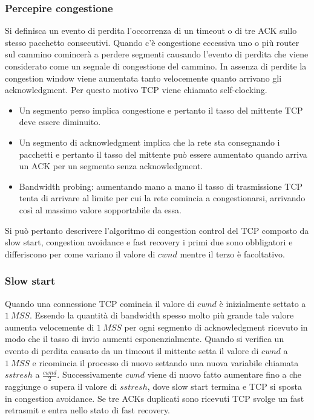 \subsubsection{Percepire congestione}
Si definisca un evento di perdita l'occorrenza di un timeout o di tre ACK sullo stesso pacchetto consecutivi. Quando c'\`e congestione eccessiva uno o pi\`u
router sul cammino comincer\`a a perdere segmenti causando l'evento di perdita che viene considerato come un segnale di congestione del cammino. In assenza
di perdite la congestion window viene aumentata tanto velocemente quanto arrivano gli acknowledgment. Per questo motivo TCP viene chiamato self-clocking. 
\begin{itemize}
\item Un segmento perso implica congestione e pertanto il tasso del mittente TCP deve essere diminuito.
\item Un segmento di acknowledgment implica che la rete sta consegnando i pacchetti e pertanto il tasso del mittente pu\`o essere aumentato quando arriva
un ACK per un segmento senza acknowledgment.
\item Bandwidth probing: aumentando mano a mano il tasso di trasmissione TCP tenta di arrivare al limite per cui la rete comincia a congestionarsi, 
arrivando cos\`i al massimo valore sopportabile da essa.
\end{itemize}
Si pu\`o pertanto descrivere l'algoritmo di congestion control del TCP composto da slow start, congestion avoidance e fast recovery i primi due sono 
obbligatori e differiscono per come variano il valore di $cwnd$ mentre il terzo \`e facoltativo.
\subsubsection{Slow start}
Quando una connessione TCP comincia il valore di $cwnd$ \`e inizialmente settato a $1\ MSS$. Essendo la quantit\`a di bandwidth spesso molto pi\`u grande
tale valore aumenta velocemente di $1\ MSS$ per ogni segmento di acknowledgment ricevuto in modo che il tasso di invio aumenti esponenzialmente. Quando si
verifica un evento di perdita causato da un timeout il mittente setta il valore di $cwnd$ a $1\ MSS$ e ricomincia il processo di nuovo settando una nuova 
variabile chiamata $sstresh$ a $\frac{cwnd}{2}$. Successivamente $cwnd$ viene di nuovo fatto aumentare fino a che raggiunge o supera il valore di $sstresh$,
dove slow start termina e TCP si sposta in congestion avoidance. Se tre ACKs duplicati sono ricevuti TCP svolge un fast retrasmit e entra nello stato di 
fast recovery. 
